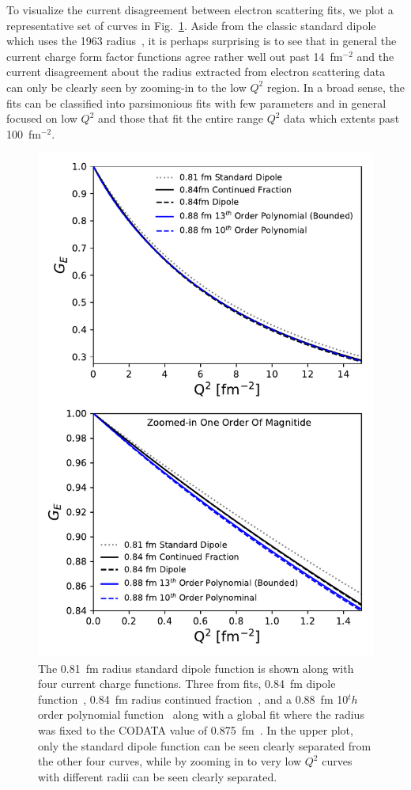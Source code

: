 \documentclass[10pt,aps,prc,twocolumn]{revtex4-1}
\begin{document}
To visualize the current disagreement between electron scattering fits, we plot a representative set of curves in Fig.~\ref{TwoOrders}.
Aside from the classic standard dipole which uses the 1963 radius~\cite{Hand:1963zz}, it is  perhaps surprising is to see that 
in general the current charge form factor functions agree rather well out past 14~fm$^{-2}$ and the current disagreement about the
radius extracted from electron scattering data can only be clearly seen by zooming-in to the low $Q^2$ region.
In a broad sense, the fits can be classified into parsimonious fits with few parameters and in general focused on low $Q^2$ and
those that fit the entire range $Q^2$ data which extents past 100~fm$^{-2}$.

\begin{figure}
\includegraphics[width=\columnwidth]{Figure/TwoOrders.pdf}
\caption{The 0.81~fm radius standard dipole function is shown along with four current charge functions.
Three from fits, 0.84~fm dipole function~\cite{Higinbotham:2015rja}, 0.84~fm radius continued fraction~\cite{Griffioen:2015hta},
and a 0.88~fm 10$^th$ order polynomial function~\cite{Bernauer:2010wm} along with a global fit where the radius was fixed
to the CODATA value of 0.875~fm~\cite{Ye:2017gyb}.   In the upper plot, only the standard dipole function can be seen clearly
separated from the other four curves, while by zooming in to very low $Q^2$ curves with different radii can be seen clearly
separated.}
\label{TwoOrders}
\end{figure}
\end{document}
